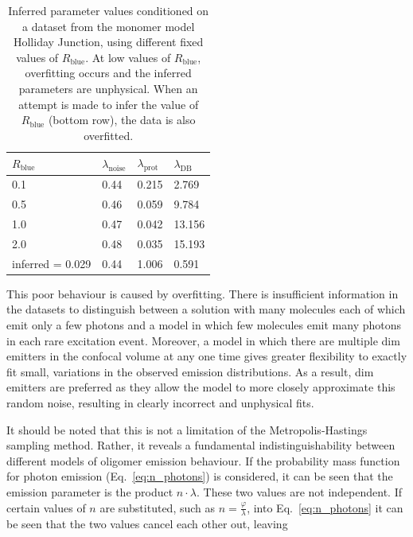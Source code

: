 \begin{center}
\begin{table}
\caption{Inferred parameter values conditioned on a dataset from the monomer model Holliday Junction, using different fixed values of $R_{\text{blue}}$. At low values of $R_{\text{blue}}$, overfitting occurs and the inferred parameters are unphysical. When an attempt is made to infer the value of $R_{\text{blue}}$ (bottom row), the data is also overfitted.}
\begin{tabular}{|l|l|l|l|}
\hline
{\bf $R_{\text{blue}}$} & {\bf $\lambda_{\text{noise}}$} & {\bf $\lambda_{\text{prot}}$} & {\bf $\lambda_{\text{DB}}$}\\ \hline
0.1 & 0.44 & 0.215 & 2.769 \\
0.5 & 0.46 & 0.059 & 9.784 \\
1.0 & 0.47 & 0.042 & 13.156 \\
2.0 & 0.48	& 0.035	& 15.193 \\
inferred = 0.029 & 0.44 & 1.006 & 0.591\\ \hline
\end{tabular}
\label{tab:R_blue}
\end{table}
\end{center}

This poor behaviour is caused by overfitting. There is insufficient information in the datasets to distinguish between a solution with many molecules each of which emit only a few photons and a model in which few molecules emit many photons in each rare excitation event. Moreover, a model in which there are multiple dim emitters in the confocal volume at any one time gives greater flexibility to exactly fit small, variations in the observed emission distributions. As a result, dim emitters are preferred as they allow the model to more closely approximate this random noise, resulting in clearly incorrect  and unphysical fits.

It should be noted that this is not a limitation of the Metropolis-Hastings sampling method. Rather, it reveals a fundamental indistinguishability between different models of oligomer emission behaviour. If the probability mass function for photon emission (Eq.~\ref{eq:n_photons}) is considered, it can be seen that the emission parameter is the product $n \cdot \lambda$. These two values are not independent. If certain values of $n$ are substituted, such as $n = \frac{\varphi}{\lambda}$, into Eq.~\ref{eq:n_photons} it can be seen that the two values cancel each other out, leaving

